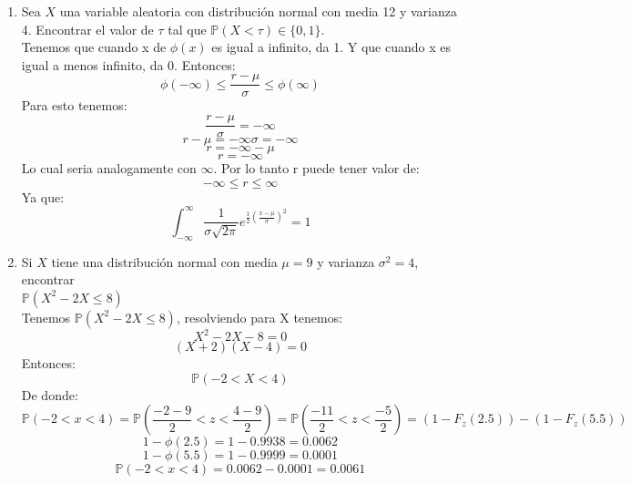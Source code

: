 \documentclass[11pt,a4paper]{report}
\begin{document}
\begin{enumerate}
{\begin{enumerate}
{				Tenemos que:
				\[\mathbb{P}(X > 9) = 1 - \mathbb{P}(X \leq 9) = .20\]
				Entonces:
				\[- \mathbb{P}(X \leq 9) = - 0.80\]
				\[\mathbb{P}(X \leq 9) = 0.80 \]
				Queremos encuentrar $\sigma$, entonces:
				\[\phi(\frac{9 - 5}{\sigma}) = 0.80 \]
				\[\phi(\frac{4}{\sigma}) = 0.80\]
				En la tabla, $0.80$ esta dentro de $\phi(.84)$ y $\phi(.85)$ tal que:
				\[\phi(.84) < 0.80 < \phi(.85) \]
				\[.7945 < .80 < .8023\]
				Aplicando la integral con $0.845$ se acerca a .80 por 2 decimales con 0.8009, entonces para:
				\[\mathbb{P}(X \leq 9) = \phi(\frac{4}{\sigma}) \approx \phi(0.845)\]
				Resolviendo $\frac{4}{\sigma} \approx 0.845$ para $\sigma$ se tiene:
				\[ \sigma \approx \frac{4}{0.845} = 4.73\]
				Por lo tanto:
				\[ \sigma \approx 4.73 ; \sigma^2 \approx 22.40 \]
				Entonces la varianza de X es aproximadamente 22.4.
				}

				\item {
					Sea $X$ una variable aleatoria con distribución normal con
					media 12 y varianza 4. Encontrar el valor de $\tau$ tal que
					$\mathbb{P}(X < \tau) \in \{0,1\}$.\\
					Tenemos que cuando x de $\phi(x)$ es igual a infinito, da 1. Y que cuando x es igual a menos infinito, da 0. Entonces:
					\[\phi(-\infty) \leq \frac{r-\mu}{\sigma} \leq \phi(\infty)\]
					Para esto tenemos:
					\[\frac{r-\mu}{\sigma} = -\infty\]
					\[ r - \mu = -\infty \sigma = -\infty\]
					\[r = -\infty - \mu \]
					\[r = -\infty\]
					Lo cual seria analogamente con $\infty$. Por lo tanto r puede tener valor de:
					\[ -\infty \leq r \leq \infty \]
					Ya que:
					\[\int^{\infty}_{-\infty}\frac{1}{\sigma\sqrt{2\pi}}e^{\frac{1}{2}(\frac{x-\mu}{\sigma})^2} = 1\]
				}

				\item {
					Si $X$ tiene una distribución normal con media $\mu = 9$ y
					varianza $\sigma^2 = 4$, encontrar \\
					$\mathbb{P}(X^2 - 2X \leq 8)$\\
					Tenemos $\mathbb{P}(X^2 - 2X \leq 8)$, resolviendo para X tenemos:
					\[X^2 - 2X - 8 = 0\]
					\[(X + 2) (X - 4) = 0\]
					Entonces:
					\[\mathbb{P}(-2 < X < 4) \]
					De donde:
					\[ \mathbb{P}(-2 < x < 4) = \mathbb{P}(\frac{-2-9}{2} < z < \frac{4-9}{2}) =\mathbb{P}(\frac{-11}{2} < z < \frac{-5}{2}) =  (1 - F_z(2.5)) - (1 - F_z(5.5))\]
					\[  1 - \phi(2.5) = 1 - 0.9938 = 0.0062\]
					\[ 1 - \phi(5.5) = 1 - 0.9999 = 0.0001 \]
					\[\mathbb{P}(-2 < x < 4) = 0.0062 - 0.0001 = 0.0061\]
				}
			\end{enumerate}
		}


\end{enumerate}
\end{document}
